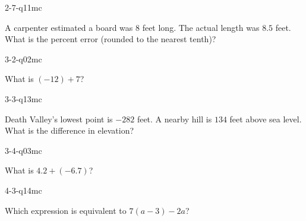 \begin{practiceQuestion}{2-7-q11}{mc}
\begin{questionText}
A carpenter estimated a board was $8$ feet long. The actual length was $8.5$ feet. What is the percent error (rounded to the nearest tenth)?
\end{questionText}
\end{practiceQuestion}

\begin{practiceQuestion}{3-2-q02}{mc}
\begin{questionText}
What is $(-12) + 7$?
\end{questionText}
\end{practiceQuestion}

\begin{practiceQuestion}{3-3-q13}{mc}
\begin{questionText}
Death Valley's lowest point is $-282$ feet. A nearby hill is $134$ feet above sea level. What is the difference in elevation?
\end{questionText}
\end{practiceQuestion}

\begin{practiceQuestion}{3-4-q03}{mc}
\begin{questionText}
What is $4.2 + (-6.7)$?
\end{questionText}
\end{practiceQuestion}

\begin{practiceQuestion}{4-3-q14}{mc}
\begin{questionText}
Which expression is equivalent to $7(a - 3) - 2a$?
\end{questionText}
\end{practiceQuestion}

